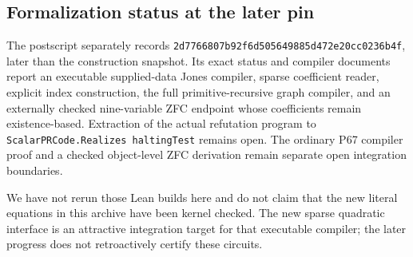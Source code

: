 \subsection{Formalization status at the later pin}
The postscript separately records
\texttt{2d7766807b92f6d505649885d472e20cc0236b4f}, later than the
construction snapshot. Its exact status and compiler documents report
an executable supplied-data Jones compiler, sparse coefficient reader,
explicit index construction, the full primitive-recursive graph compiler,
and an externally checked nine-variable ZFC endpoint whose coefficients
remain existence-based. Extraction of the actual refutation program to
\texttt{ScalarPRCode.Realizes haltingTest} remains open. The ordinary P67
compiler proof and a checked object-level ZFC derivation remain separate
open integration boundaries.

We have not rerun those Lean builds here and do not claim that the new
literal equations in this archive have been kernel checked. The new sparse
quadratic interface is an attractive integration target for that executable
compiler; the later progress does not retroactively certify these circuits.
